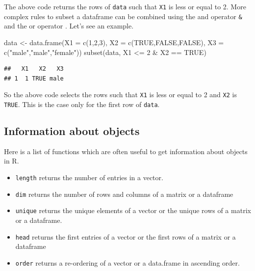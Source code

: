 \documentclass[
]{book}
\newenvironment{Shaded}{\begin{snugshade}}{\end{snugshade}}
\newcommand{\AttributeTok}[1]{\textcolor[rgb]{0.77,0.63,0.00}{#1}}
\newcommand{\ConstantTok}[1]{\textcolor[rgb]{0.00,0.00,0.00}{#1}}
\newcommand{\DecValTok}[1]{\textcolor[rgb]{0.00,0.00,0.81}{#1}}
\newcommand{\FunctionTok}[1]{\textcolor[rgb]{0.00,0.00,0.00}{#1}}
\newcommand{\NormalTok}[1]{#1}
\newcommand{\OtherTok}[1]{\textcolor[rgb]{0.56,0.35,0.01}{#1}}
\newcommand{\SpecialCharTok}[1]{\textcolor[rgb]{0.00,0.00,0.00}{#1}}
\newcommand{\StringTok}[1]{\textcolor[rgb]{0.31,0.60,0.02}{#1}}
\begin{document}
The above code returns the rows of \texttt{data} such that \texttt{X1} is less or equal to 2. More complex rules to subset a dataframe can be combined using the and operator \texttt{\&} and the or operator \texttt{\textbar{}}. Let's see an example.

\begin{Shaded}
\begin{Highlighting}[]
\NormalTok{data }\OtherTok{\textless{}{-}} \FunctionTok{data.frame}\NormalTok{(}\AttributeTok{X1 =} \FunctionTok{c}\NormalTok{(}\DecValTok{1}\NormalTok{,}\DecValTok{2}\NormalTok{,}\DecValTok{3}\NormalTok{), }\AttributeTok{X2 =} \FunctionTok{c}\NormalTok{(}\ConstantTok{TRUE}\NormalTok{,}\ConstantTok{FALSE}\NormalTok{,}\ConstantTok{FALSE}\NormalTok{),}
                   \AttributeTok{X3 =} \FunctionTok{c}\NormalTok{(}\StringTok{"male"}\NormalTok{,}\StringTok{"male"}\NormalTok{,}\StringTok{"female"}\NormalTok{))}
\FunctionTok{subset}\NormalTok{(data, X1 }\SpecialCharTok{\textless{}=} \DecValTok{2} \SpecialCharTok{\&}\NormalTok{ X2 }\SpecialCharTok{==} \ConstantTok{TRUE}\NormalTok{)}
\end{Highlighting}
\end{Shaded}

\begin{verbatim}
##   X1   X2   X3
## 1  1 TRUE male
\end{verbatim}

So the above code selects the rows such that \texttt{X1} is less or equal to 2 and \texttt{X2} is \texttt{TRUE}. This is the case only for the first row of \texttt{data}.

\hypertarget{information-about-objects}{%
\subsection{Information about objects}\label{information-about-objects}}

Here is a list of functions which are often useful to get information about objects in R.

\begin{itemize}
\item
  \texttt{length} returns the number of entries in a vector.
\item
  \texttt{dim} returns the number of rows and columns of a matrix or a dataframe
\item
  \texttt{unique} returns the unique elements of a vector or the unique rows of a matrix or a dataframe.
\item
  \texttt{head} returns the first entries of a vector or the first rows of a matrix or a dataframe
\item
  \texttt{order} returns a re-ordering of a vector or a data.frame in ascending order.
\end{itemize}
\end{document}
